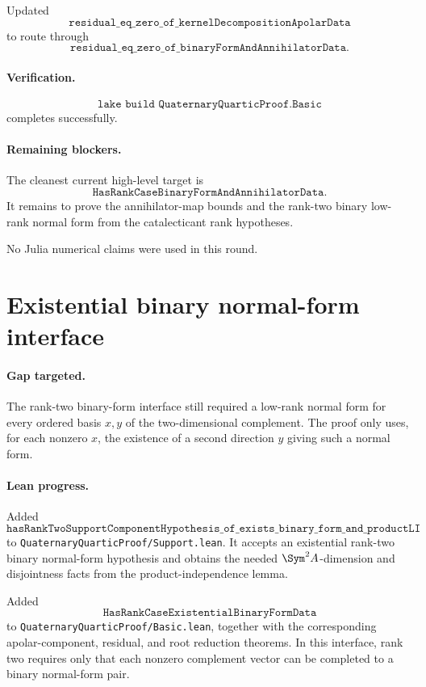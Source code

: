 \documentclass[11pt]{article}
\begin{document}
Updated
\[
\texttt{residual\_eq\_zero\_of\_kernelDecompositionApolarData}
\]
to route through
\[
\texttt{residual\_eq\_zero\_of\_binaryFormAndAnnihilatorData}.
\]

\paragraph{Verification.}
\[
\texttt{lake build QuaternaryQuarticProof.Basic}
\]
completes successfully.

\paragraph{Remaining blockers.}
The cleanest current high-level target is
\[
\texttt{HasRankCaseBinaryFormAndAnnihilatorData}.
\]
It remains to prove the annihilator-map bounds and the rank-two binary
low-rank normal form from the catalecticant rank hypotheses.

No Julia numerical claims were used in this round.

\section*{Existential binary normal-form interface}

\paragraph{Gap targeted.}
The rank-two binary-form interface still required a low-rank normal form for
every ordered basis \(x,y\) of the two-dimensional complement.  The proof only
uses, for each nonzero \(x\), the existence of a second direction \(y\) giving
such a normal form.

\paragraph{Lean progress.}
Added
\[
\texttt{hasRankTwoSupportComponentHypothesis\_of\_exists\_binary\_form\_and\_productLI}
\]
to \texttt{QuaternaryQuarticProof/Support.lean}.  It accepts an existential
rank-two binary normal-form hypothesis and obtains the needed
\(\Sym^2A\)-dimension and disjointness facts from the product-independence
lemma.

Added
\[
\texttt{HasRankCaseExistentialBinaryFormData}
\]
to \texttt{QuaternaryQuarticProof/Basic.lean}, together with the corresponding
apolar-component, residual, and root reduction theorems.  In this interface,
rank two requires only that each nonzero complement vector can be completed to
a binary normal-form pair.
\end{document}
